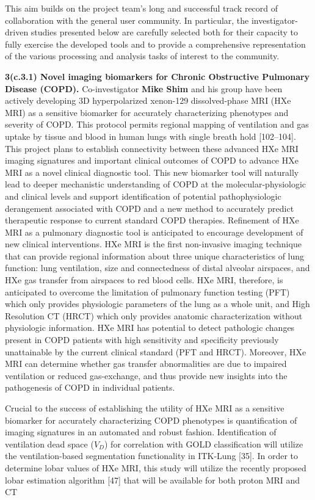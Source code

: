 \documentclass[11pt,]{article}
\begin{document}
This aim builds on the project team's long and successful track record
of collaboration with the general user community. In particular, the
investigator-driven studies presented below are carefully selected both
for their capacity to fully exercise the developed tools and to provide
a comprehensive representation of the various processing and analysis
tasks of interest to the community.

\textbf{3(c.3.1) Novel imaging biomarkers for Chronic Obstructive
Pulmonary Disease (COPD).} Co-investigator \textbf{Mike Shim} and his
group have been actively developing 3D hyperpolarized xenon-129
dissolved-phase MRI (HXe MRI) as a sensitive biomarker for accurately
characterizing phenotypes and severity of COPD. This protocol permits
regional mapping of ventilation and gas uptake by tissue and blood in
human lungs with single breath hold {[}102--104{]}. This project plans
to establish connectivity between these advanced HXe MRI imaging
signatures and important clinical outcomes of COPD to advance HXe MRI as
a novel clinical diagnostic tool. This new biomarker tool will naturally
lead to deeper mechanistic understanding of COPD at the
molecular-physiologic and clinical levels and support identification of
potential pathophysiologic derangement associated with COPD and a new
method to accurately predict therapeutic response to current standard
COPD therapies. Refinement of HXe MRI as a pulmonary diagnostic tool is
anticipated to encourage development of new clinical interventions. HXe
MRI is the first non-invasive imaging technique that can provide
regional information about three unique characteristics of lung
function: lung ventilation, size and connectedness of distal alveolar
airspaces, and HXe gas transfer from airspaces to red blood cells. HXe
MRI, therefore, is anticipated to overcome the limitation of pulmonary
function testing (PFT) which only provides physiologic parameters of the
lung as a whole unit, and High Resolution CT (HRCT) which only provides
anatomic characterization without physiologic information. HXe MRI has
potential to detect pathologic changes present in COPD patients with
high sensitivity and specificity previously unattainable by the current
clinical standard (PFT and HRCT). Moreover, HXe MRI can determine
whether gas transfer abnormalities are due to impaired ventilation or
reduced gas-exchange, and thus provide new insights into the
pathogenesis of COPD in individual patients.

Crucial to the success of establishing the utility of HXe MRI as a
sensitive biomarker for accurately characterizing COPD phenotypes is
quantification of imaging signatures in an automated and robust fashion.
Identification of ventilation dead space (\(V_D\)) for correlation with
GOLD classification will utilize the ventilation-based segmentation
functionality in ITK-Lung {[}35{]}. In order to determine lobar values
of HXe MRI, this study will utilize the recently proposed lobar
estimation algorithm {[}47{]} that will be available for both proton MRI
and CT
\end{document}

